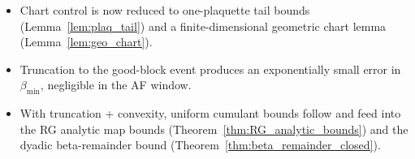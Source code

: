 \begin{itemize}
\item Chart control is now reduced to one-plaquette tail bounds (Lemma~\ref{lem:plaq_tail}) and a finite-dimensional geometric chart lemma (Lemma~\ref{lem:geo_chart}).
\item Truncation to the good-block event produces an exponentially small error in $\beta_{\min}$, negligible in the AF window.
\item With truncation + convexity, uniform cumulant bounds follow and feed into the RG analytic map bounds (Theorem~\ref{thm:RG_analytic_bounds}) and the dyadic beta-remainder bound (Theorem~\ref{thm:beta_remainder_closed}).
\end{itemize}
